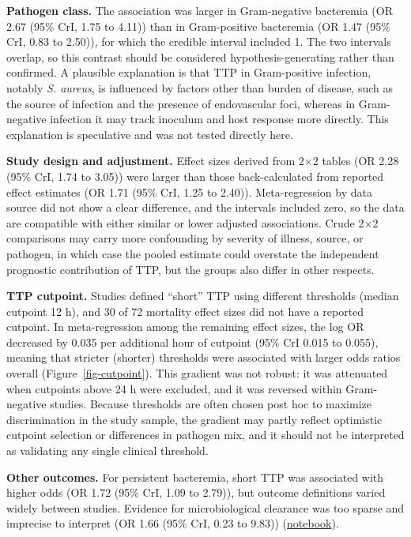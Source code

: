\documentclass[
  11pt,
]{article}
\begin{document}
\textbf{Pathogen class.} The association was larger in Gram-negative
bacteremia (OR 2.67 (95\% CrI, 1.75 to 4.11)) than in Gram-positive
bacteremia (OR 1.47 (95\% CrI, 0.83 to 2.50)), for which the credible
interval included 1. The two intervals overlap, so this contrast should
be considered hypothesis-generating rather than confirmed. A plausible
explanation is that TTP in Gram-positive infection, notably \emph{S.
aureus}, is influenced by factors other than burden of disease, such as
the source of infection and the presence of endovascular foci, whereas
in Gram-negative infection it may track inoculum and host response more
directly. This explanation is speculative and was not tested directly
here.

\textbf{Study design and adjustment.} Effect sizes derived from 2×2
tables (OR 2.28 (95\% CrI, 1.74 to 3.05)) were larger than those
back-calculated from reported effect estimates (OR 1.71 (95\% CrI, 1.25
to 2.40)). Meta-regression by data source did not show a clear
difference, and the intervals included zero, so the data are compatible
with either similar or lower adjusted associations. Crude 2×2
comparisons may carry more confounding by severity of illness, source,
or pathogen, in which case the pooled estimate could overstate the
independent prognostic contribution of TTP, but the groups also differ
in other respects.

\textbf{TTP cutpoint.} Studies defined ``short'' TTP using different
thresholds (median cutpoint 12 h), and 30 of 72 mortality effect sizes
did not have a reported cutpoint. In meta-regression among the remaining
effect sizes, the log OR decreased by 0.035 per additional hour of
cutpoint (95\% CrI 0.015 to 0.055), meaning that stricter (shorter)
thresholds were associated with larger odds ratios overall
(Figure~\ref{fig-cutpoint}). This gradient was not robust: it was
attenuated when cutpoints above 24 h were excluded, and it was reversed
within Gram-negative studies. Because thresholds are often chosen post
hoc to maximize discrimination in the study sample, the gradient may
partly reflect optimistic cutpoint selection or differences in pathogen
mix, and it should not be interpreted as validating any single clinical
threshold.

\textbf{Other outcomes.} For persistent bacteremia, short TTP was
associated with higher odds (OR 1.72 (95\% CrI, 1.09 to 2.79)), but
outcome definitions varied widely between studies. Evidence for
microbiological clearance was too sparse and imprecise to interpret (OR
1.66 (95\% CrI, 0.23 to 9.83))
(\href{notebooks/clinical_failure.qmd}{notebook}).
\end{document}
